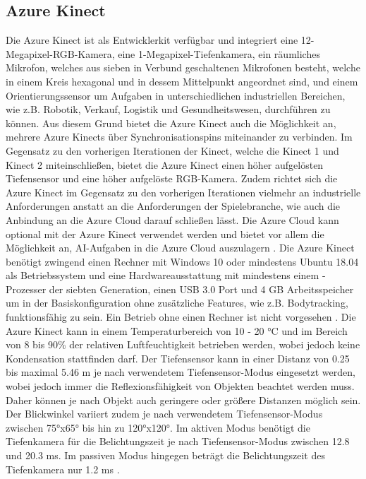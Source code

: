 \subsection{Azure Kinect}
Die Azure Kinect ist als Entwicklerkit verfügbar und integriert eine 12-Megapixel-RGB-Kamera, eine 1-Megapixel-Tiefenkamera, ein räumliches Mikrofon, welches aus sieben in Verbund geschaltenen Mikrofonen besteht, welche in einem Kreis hexagonal und in dessem Mittelpunkt angeordnet sind, und einem Orientierungssensor um Aufgaben in unterschiedlichen industriellen Bereichen, wie z.B. Robotik, Verkauf, Logistik und Gesundheitswesen, durchführen zu können. Aus diesem Grund bietet die Azure Kinect auch die Möglichkeit an, mehrere Azure Kinects über Synchronisationspins miteinander zu verbinden. Im Gegensatz zu den vorherigen Iterationen der Kinect, welche die Kinect 1 und Kinect 2 miteinschließen, bietet die Azure Kinect einen höher aufgelösten Tiefensensor und eine höher aufgelöste RGB-Kamera. Zudem richtet sich die Azure Kinect im Gegensatz zu den vorherigen Iterationen vielmehr an industrielle Anforderungen anstatt an die Anforderungen der Spielebranche, wie auch die Anbindung an die Azure Cloud darauf schließen lässt. Die Azure Cloud kann optional mit der Azure Kinect verwendet werden und bietet vor allem die Möglichkeit an, AI-Aufgaben in die Azure Cloud auszulagern \cite{noauthor_azure_kinect_2020}. Die Azure Kinect benötigt zwingend einen Rechner mit Windows 10 oder mindestens Ubuntu 18.04 als Betriebssystem und eine Hardwareausstattung mit mindestens einem -Prozesser der siebten Generation, einen USB 3.0 Port und 4 GB Arbeitsspeicher um in der Basiskonfiguration ohne zusätzliche Features, wie z.B. Bodytracking, funktionsfähig zu sein. Ein Betrieb ohne einen Rechner ist nicht vorgesehen \cite{noauthor_azure_kinect_dk_nodate}. Die Azure Kinect kann in einem Temperaturbereich von 10 - 20 °C und im Bereich von 8 bis 90\% der relativen Luftfeuchtigkeit betrieben werden, wobei jedoch keine Kondensation stattfinden darf. Der Tiefensensor kann in einer Distanz von \num{0,25} bis maximal \num{5,46} m je nach verwendetem Tiefensensor-Modus eingesetzt werden, wobei jedoch immer die Reflexionsfähigkeit von Objekten beachtet werden muss. Daher können je nach Objekt auch geringere oder größere Distanzen möglich sein. Der Blickwinkel variiert zudem je nach verwendetem Tiefensensor-Modus zwischen 75°x65° bis hin zu 120°x120°. Im aktiven Modus benötigt die Tiefenkamera für die Belichtungszeit je nach Tiefensensor-Modus zwischen \num{12,8} und \num{20,3} ms. Im passiven Modus hingegen beträgt die Belichtungszeit des Tiefenkamera nur \num{1,2} ms \cite{tesych_azure_nodate}.


